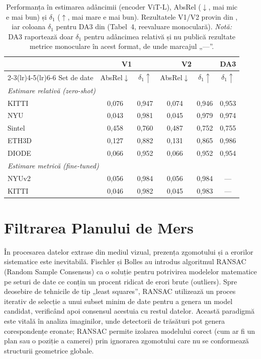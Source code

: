 \begin{table}[htbp]
    \centering
    \begin{tabular}{lccccc}
        \toprule
         & \multicolumn{2}{c}{V1} & \multicolumn{2}{c}{V2} & DA3 \\
        \cmidrule(lr){2-3}\cmidrule(lr){4-5}\cmidrule(lr){6-6}
        Set de date & AbsRel$\downarrow$ & $\delta_1\uparrow$ & AbsRel$\downarrow$ & $\delta_1\uparrow$ & $\delta_1\uparrow$ \\
        \midrule
        \multicolumn{6}{l}{\textit{Estimare relativă (zero-shot)}} \\
        KITTI  & 0,076 & 0,947 & 0,074 & 0,946 & 0,953 \\
        NYU    & 0,043 & 0,981 & 0,045 & 0,979 & 0,974 \\
        Sintel & 0,458 & 0,760 & 0,487 & 0,752 & 0,755 \\
        ETH3D  & 0,127 & 0,882 & 0,131 & 0,865 & 0,986 \\
        DIODE  & 0,066 & 0,952 & 0,066 & 0,952 & 0,954 \\
        \midrule
        \multicolumn{6}{l}{\textit{Estimare metrică (fine-tuned)}} \\
        NYUv2  & 0,056 & 0,984 & 0,056 & 0,984 & --- \\
        KITTI  & 0,046 & 0,982 & 0,045 & 0,983 & --- \\
        \bottomrule
    \end{tabular}
    \caption{Performanța în estimarea adâncimii (encoder ViT-L), AbsRel ($\downarrow$, mai mic e mai bun) și $\delta_1$ ($\uparrow$, mai mare e mai bun). Rezultatele V1/V2 provin din \cite{yang2024depthv1, yang2024depth}, iar coloana $\delta_1$ pentru DA3 din \cite{depthanything3} (Tabel~4, reevaluare monoculară). \emph{Notă:} DA3 raportează doar $\delta_1$ pentru adâncimea relativă și nu publică rezultate metrice monoculare în acest format, de unde marcajul „---”.}
    \label{tab:da_perf}
\end{table}

\section{Filtrarea Planului de Mers}
\label{sec:ch2sec3}

\par În procesarea datelor extrase din mediul vizual, prezența zgomotului și a erorilor sistematice este inevitabilă. Fischler și Bolles \cite{10.1145/358669.358692} au introdus algoritmul RANSAC (Random Sample Consensus) ca o soluție pentru potrivirea modelelor matematice pe seturi de date ce conțin un procent ridicat de erori brute (outliers). Spre deosebire de tehnicile de tip „least squares”, RANSAC utilizează un proces iterativ de selecție a unui subset minim de date pentru a genera un model candidat, verificând apoi consensul acestuia cu restul datelor. Această paradigmă este vitală în analiza imaginilor, unde detectorii de trăsături pot genera corespondențe eronate; RANSAC permite izolarea modelului corect (cum ar fi un plan sau o poziție a camerei) prin ignorarea zgomotului care nu se conformează structurii geometrice globale.

